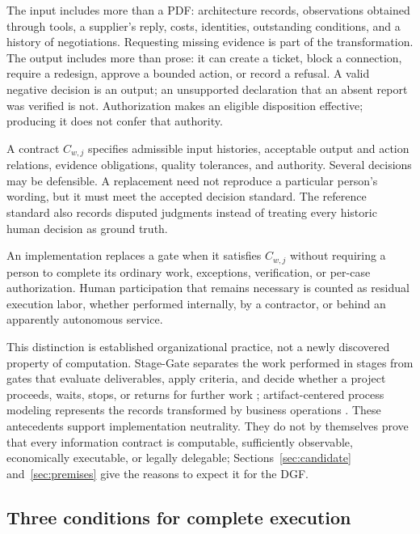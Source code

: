 The input includes more than a PDF: architecture records, observations obtained through tools, a
supplier's reply, costs, identities, outstanding conditions, and a history of negotiations. Requesting
missing evidence is part of the transformation. The output includes more than prose: it can create a
ticket, block a connection, require a redesign, approve a bounded action, or record a refusal. A valid
negative decision is an output; an unsupported declaration that an absent report was verified is not.
Authorization makes an eligible disposition effective; producing it does not confer that authority.

A contract $C_{w,j}$ specifies admissible input histories, acceptable output and action relations,
evidence obligations, quality tolerances, and authority. Several decisions may be defensible. A
replacement need not reproduce a particular person's wording, but it must meet the accepted decision
standard. The reference standard also records disputed judgments instead of treating every historic
human decision as ground truth.

\begin{definition}
An implementation replaces a gate when it satisfies $C_{w,j}$ without requiring a person to complete
its ordinary work, exceptions, verification, or per-case authorization. Human participation that
remains necessary is counted as residual execution labor, whether performed internally, by a
contractor, or behind an apparently autonomous service.
\end{definition}

This distinction is established organizational practice, not a newly discovered property of
computation. Stage-Gate separates the work performed in stages from gates that evaluate deliverables, apply
criteria, and decide whether a project proceeds, waits, stops, or returns for further work
\citep[p.~46]{cooper1990}; artifact-centered process modeling represents the records transformed by
business operations \citep{nigam2003}. These antecedents support implementation neutrality. They do
not by themselves prove that every information contract is computable, sufficiently observable,
economically executable, or legally delegable; Sections~\ref{sec:candidate}
and~\ref{sec:premises} give the reasons to expect it for the DGF.

\subsection{Three conditions for complete execution}
\label{sec:conditions}

